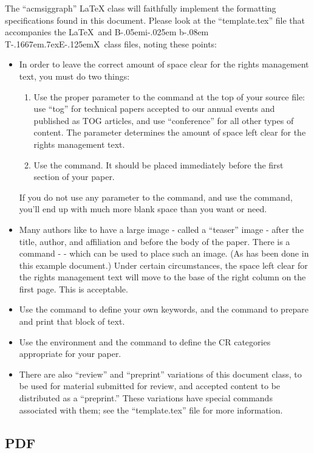 \documentclass[tog]{acmsiggraph}
\def\BibTeX{{\rm B\kern-.05em{\sc i\kern-.025em b}\kern-.08em
    T\kern-.1667em\lower.7ex\hbox{E}\kern-.125emX}}
\begin{document}
The ``acmsiggraph'' \LaTeX{} class will faithfully implement the formatting specifications found in this document. Please look at the ``template.tex'' file that accompanies the \LaTeX\ and \BibTeX\ class files, noting these points:
\begin{itemize}
\item In order to leave the correct amount of space clear for the rights management text, you must do two things: 
\begin{enumerate}
\item Use the proper parameter to the  command at the top of your source file: use ``tog'' for technical papers accepted to our annual events and published as TOG articles, and use ``conference'' for all other types of content. The parameter determines the amount of space left clear for the rights management text.
\item Use the  command. It should be placed immediately before the first section of your paper.
\end{enumerate}
If you do not use any parameter to the  command, and use the  command, you'll end up with much more blank space than you want or need.

\item Many authors like to have a large image - called a ``teaser'' image - after the title, author, and affiliation and before the body of the paper. There is a command -  - which can be used to place such an image. (As has been done in this example document.) Under certain circumstances, the space left clear for the rights management text will move to the base of the right column on the first page. This is acceptable.
\item Use the  command to define your own keywords, and the  command to prepare and print that block of text.
\item Use the  environment and the  command to define the CR categories appropriate for your paper.
\item There are also ``review'' and ``preprint'' variations of this document class, to be used for material submitted for review, and accepted content to be distributed as a ``preprint.'' These variations have special commands associated with them; see the ``template.tex'' file for more information.
\end{itemize}

\subsection{PDF}
\end{document}
